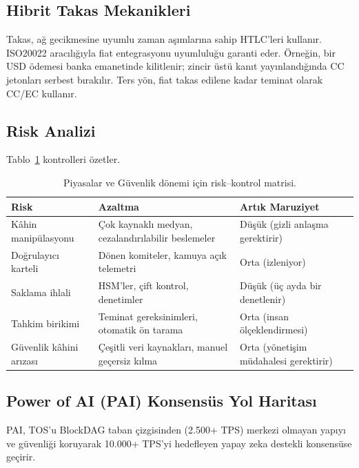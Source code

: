 \documentclass[11pt]{article}
\begin{document}
\subsection{Hibrit Takas Mekanikleri}
Takas, ağ gecikmesine uyumlu zaman aşımlarına sahip HTLC'leri kullanır. ISO20022 aracılığıyla fiat entegrasyonu uyumluluğu garanti eder. Örneğin, bir USD ödemesi banka emanetinde kilitlenir; zincir üstü kanıt yayınlandığında CC jetonları serbest bırakılır. Ters yön, fiat takas edilene kadar teminat olarak CC/EC kullanır.

\subsection{Risk Analizi}
Tablo~\ref{tab:risk-markets} kontrolleri özetler.

\begin{table}[H]
  \centering
  \begin{tabular}{p{}p{}p{}}
    \toprule
    \textbf{Risk} & \textbf{Azaltma} & \textbf{Artık Maruziyet} \\
    \midrule
    Kâhin manipülasyonu & Çok kaynaklı medyan, cezalandırılabilir beslemeler & Düşük (gizli anlaşma gerektirir) \\
    Doğrulayıcı karteli & Dönen komiteler, kamuya açık telemetri & Orta (izleniyor) \\
    Saklama ihlali & HSM'ler, çift kontrol, denetimler & Düşük (üç ayda bir denetlenir) \\
    Tahkim birikimi & Teminat gereksinimleri, otomatik ön tarama & Orta (insan ölçeklendirmesi) \\
    Güvenlik kâhini arızası & Çeşitli veri kaynakları, manuel geçersiz kılma & Orta (yönetişim müdahalesi gerektirir) \\
    \bottomrule
  \end{tabular}
  \caption{Piyasalar ve Güvenlik dönemi için risk--kontrol matrisi.}
  \label{tab:risk-markets}
\end{table}

\subsection{Power of AI (PAI) Konsensüs Yol Haritası}
\label{sec:pai-roadmap}
PAI, TOS'u BlockDAG taban çizgisinden (2.500+ TPS) merkezi olmayan yapıyı ve güvenliği koruyarak 10.000+ TPS'yi hedefleyen yapay zeka destekli konsensüse geçirir.
\end{document}

